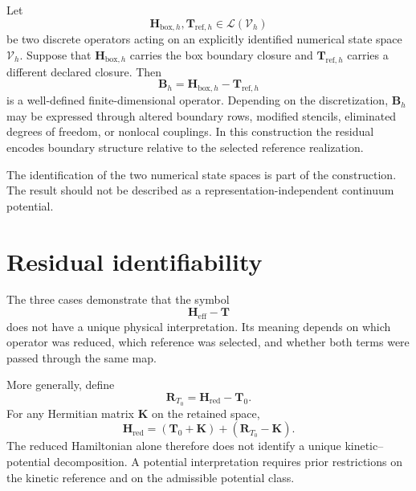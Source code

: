 Let
\begin{equation}
    \mathbf H_{\mathrm{box},h},
    \mathbf T_{\mathrm{ref},h}
    \in
    \mathcal L(\mathcal V_h)
\end{equation}
be two discrete operators acting on an explicitly identified numerical state
space $\mathcal V_h$. Suppose that $\mathbf H_{\mathrm{box},h}$ carries the
box boundary closure and $\mathbf T_{\mathrm{ref},h}$ carries a different
declared closure. Then
\begin{equation}
    \mathbf B_h
    =
    \mathbf H_{\mathrm{box},h}
    -
    \mathbf T_{\mathrm{ref},h}
\end{equation}
is a well-defined finite-dimensional operator. Depending on the
discretization, $\mathbf B_h$ may be expressed through altered boundary rows,
modified stencils, eliminated degrees of freedom, or nonlocal couplings. In
this construction the residual encodes boundary structure relative to the
selected reference realization.

The identification of the two numerical state spaces is part of the
construction. The result should not be described as a
representation-independent continuum potential.

\section{Residual identifiability}

The three cases demonstrate that the symbol
\begin{equation}
    \mathbf H_{\mathrm{eff}}-\mathbf T
\end{equation}
does not have a unique physical interpretation. Its meaning depends on which
operator was reduced, which reference was selected, and whether both terms
were passed through the same map.

More generally, define
\begin{equation}
    \mathbf R_{T_0}
    =
    \mathbf H_{\mathrm{red}}-\mathbf T_0.
\end{equation}
For any Hermitian matrix $\mathbf K$ on the retained space,
\begin{equation}
    \mathbf H_{\mathrm{red}}
    =
    (\mathbf T_0+\mathbf K)
    +
    (\mathbf R_{T_0}-\mathbf K).
\end{equation}
The reduced Hamiltonian alone therefore does not identify a unique
kinetic--potential decomposition. A potential interpretation requires prior
restrictions on the kinetic reference and on the admissible potential class.

